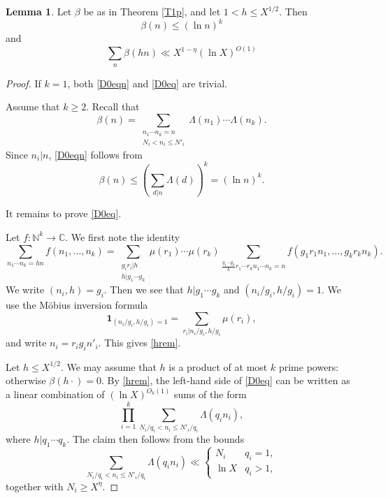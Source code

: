 \documentclass{amsart}
\theoremstyle{definition}
\newtheorem{lem}[dfn]{Lemma}
\theoremstyle{remark}
\newcommand{\1}{
    \bm{1}
}
\begin{document}
\begin{lem}\label{D0}
Let $\beta$ be as in Theorem \ref{T1p}, and let $1 < h \leq X^{1/2}$. Then
\begin{equation} \label{D0eqn} \beta(n) \leq (\ln{n})^k \end{equation}
and
\begin{equation} \label{D0eq} \sum_{n} \beta(hn) \ll X^{1-\eta} (\ln{X})^{O(1)} \end{equation}
\end{lem}

\begin{proof}



If $k=1$, both \eqref{D0eqn} and \eqref{D0eq} are trivial.


Assume that $k \geq 2$. Recall that
\[ \beta(n) = \sum_{\substack{n_1 \cdots n_k = n \\ N_i < n_i \leq N'_i}} \Lambda(n_1) \cdots \Lambda(n_k). \]
Since $n_i|n$, \eqref{D0eqn} follows from
\[ \beta(n) \leq \left( \sum_{d|n} \Lambda(d) \right)^k = (\ln{n})^k. \]


It remains to prove \eqref{D0eq}. 

Let $f:\mathbb{N}^k \to \mathbb{C}$. We first note the identity
\begin{equation} \label{hrem} \sum_{n_1 \cdots n_k = hn} f(n_1,\ldots,n_k) = \sum_{\substack{g_i r_i|h \\ h|g_1 \cdots g_k}} \mu(r_1) \cdots \mu(r_k) \sum_{\frac{g_1 \cdots g_k}{h} r_1 \cdots r_k n_1 \cdots n_k = n} f(g_1r_1n_1,\ldots,g_kr_kn_k). \end{equation} 
We write $(n_i,h)=g_i$. Then we see that $h|g_1 \cdots g_k$ and $(n_i/g_i,h/g_i)=1$. We use the Möbius inversion formula 
\[ \1_{(n_i/g_i,h/g_i)=1} = \sum_{r_i|n_i/g_i,h/g_i} \mu(r_i), \]
and write $n_i=r_i g_i n'_i$. This gives \eqref{hrem}. 

Let $h \leq X^{1/2}$. We may assume that $h$ is a product of at most $k$ prime powers: otherwise $\beta(h \cdot)=0$. By \eqref{hrem}, the left-hand side of \eqref{D0eq} can be written as a linear combination of $(\ln{X})^{O_k(1)}$ sums of the form
\[ \prod_{i=1}^{k} \sum_{N_i/q_i< n_i \leq N'_i/q_i} \Lambda(q_i n_i), \]
where $h|q_1 \cdots q_k$. 
The claim then follows from the bounds
\[ \sum_{N_i/q_i< n_i \leq N'_i/q_i} \Lambda(q_i n_i) \ll
\begin{cases}
N_i & q_i=1, \\
\ln{X} & q_i>1,
\end{cases}
\]
together with $N_i \geq X^{\eta}$. 
\end{proof}
\end{document}

